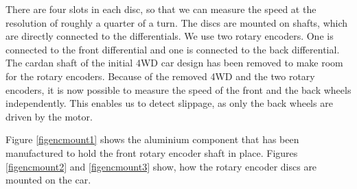 \documentclass[a4paper
               ,10pt
               ,DIV=10 %
               ,BCOR=0.3cm
               ,pagesize %
               ,headings=small
               ,bibtotoc
               ]
               {scrartcl}
\begin{document}
There are four slots in each disc, so that we can measure the speed at the resolution of roughly a quarter of a turn.
The discs are mounted on shafts, which are directly connected to the differentials.
We use two rotary encoders.
One is connected to the front differential and one is connected to the back differential.
The cardan shaft of the initial 4WD car design has been removed to make room for the rotary encoders.
Because of the removed 4WD and the two rotary encoders, it is now possible to measure the speed of the front and the back wheels independently.
This enables us to detect slippage, as only the back wheels are driven by the motor.

Figure \ref{figencmount1} shows the aluminium component that has been manufactured to hold the front rotary encoder shaft in place.
Figures \ref{figencmount2} and \ref{figencmount3} show, how the rotary encoder discs are mounted on the car.
\end{document}
